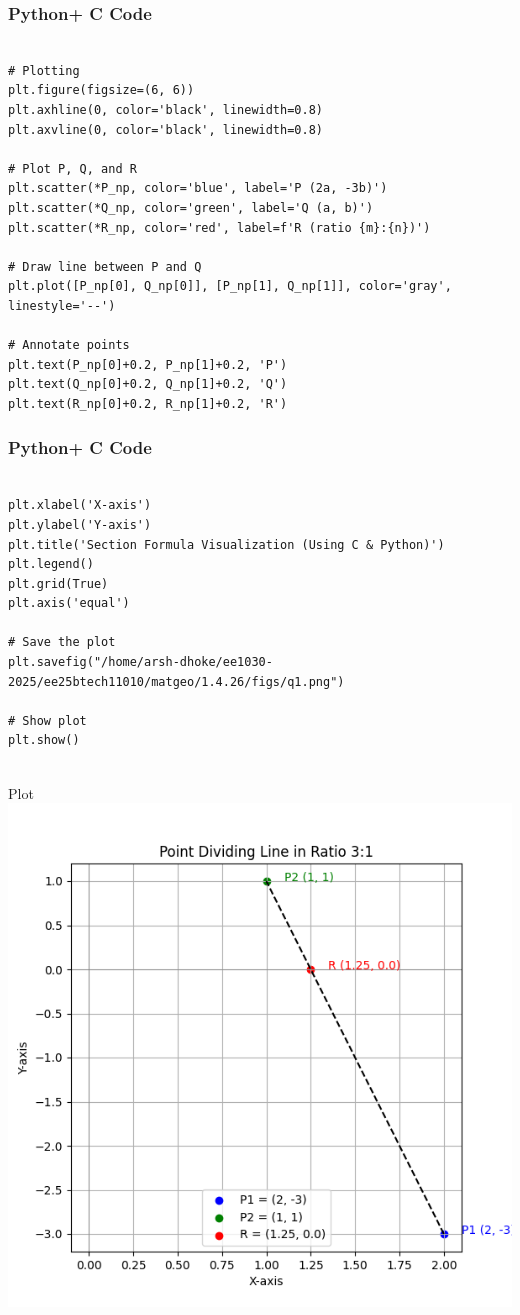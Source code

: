 \documentclass{beamer}
\begin{document}
\begin{frame}[fragile]
    \frametitle{Python+ C Code}

    \begin{lstlisting}

# Plotting
plt.figure(figsize=(6, 6))
plt.axhline(0, color='black', linewidth=0.8)
plt.axvline(0, color='black', linewidth=0.8)

# Plot P, Q, and R
plt.scatter(*P_np, color='blue', label='P (2a, -3b)')
plt.scatter(*Q_np, color='green', label='Q (a, b)')
plt.scatter(*R_np, color='red', label=f'R (ratio {m}:{n})')

# Draw line between P and Q
plt.plot([P_np[0], Q_np[0]], [P_np[1], Q_np[1]], color='gray', linestyle='--')

# Annotate points
plt.text(P_np[0]+0.2, P_np[1]+0.2, 'P')
plt.text(Q_np[0]+0.2, Q_np[1]+0.2, 'Q')
plt.text(R_np[0]+0.2, R_np[1]+0.2, 'R')

\end{lstlisting}
\end{frame}

\begin{frame}[fragile]
    \frametitle{Python+ C Code}

    \begin{lstlisting}

plt.xlabel('X-axis')
plt.ylabel('Y-axis')
plt.title('Section Formula Visualization (Using C & Python)')
plt.legend()
plt.grid(True)
plt.axis('equal')

# Save the plot
plt.savefig("/home/arsh-dhoke/ee1030-2025/ee25btech11010/matgeo/1.4.26/figs/q1.png")

# Show plot
plt.show()


      \end{lstlisting}
\end{frame}

\begin{frame}{Plot}
\centering
\includegraphics[height=0.7\textheight, keepaspectratio]{figs/q1.png}
\end{frame}
\end{document}
